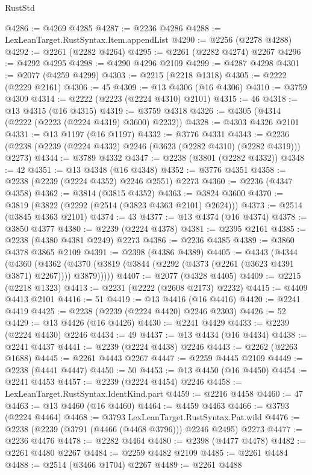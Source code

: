 \begin{lexlean}{RustStd}
\begin{coremodule}
@4286 := @4269 @4285
@4287 := @2236 @4286
@4288 := LexLeanTarget.RustSyntax.Item.appendList
@4290 := @2256 (@2278 @4288)
@4292 := @2261 (@2282 @4264)
@4295 := @2261 (@2282 @4274) @2267
@4296 := @4292 @4295
@4298 := @4290 @4296 @2109
@4299 := @4287 @4298
@4301 := @2077 (@4259 @4299)
@4303 := @2215 (@2218 @1318)
@4305 := @2222 (@2229 @2161)
@4306 := 45
@4309 := @13 @4306 (@16 @4306)
@4310 := @3759 @4309
@4314 := @2222 (@2223 (@2224 @4310) @2101)
@4315 := 46
@4318 := @13 @4315 (@16 @4315)
@4319 := @3759 @4318
@4326 := @4305 (@4314 (@2222 (@2223 (@2224 @4319) @3600) @2232))
@4328 := @4303 @4326 @2101
@4331 := @13 @1197 (@16 @1197)
@4332 := @3776 @4331
@4343 := @2236 (@2238 (@2239 (@2224 @4332) @2246 (@3623 (@2282 @4310) (@2282 @4319))) @2273)
@4344 := @3789 @4332
@4347 := @2238 (@3801 (@2282 @4332))
@4348 := 42
@4351 := @13 @4348 (@16 @4348)
@4352 := @3776 @4351
@4358 := @2238 (@2239 (@2224 @4352) @2246 @2551) @2273
@4360 := @2236 (@4347 @4358)
@4362 := @3814 (@3815 @4352)
@4363 := @3824 @3600
@4370 := @3819 (@3822 (@2292 (@2514 (@3823 @4363 @2101) @2624)))
@4373 := @2514 (@3845 @4363 @2101)
@4374 := 43
@4377 := @13 @4374 (@16 @4374)
@4378 := @3850 @4377
@4380 := @2239 (@2224 @4378)
@4381 := @2395 @2161
@4385 := @2238 (@4380 @4381 @2249) @2273
@4386 := @2236 @4385
@4389 := @3860 @4378 @3865 @2109
@4391 := @2398 (@4386 @4389)
@4405 := @4343
    (@4344
      (@4360
        (@4362 (@4370 (@3819 (@3844 (@2292 (@4373 (@2261 (@3623 @4391 @3871) @2267)))) @3879)))))
@4407 := @2077 (@4328 @4405)
@4409 := @2215 (@2218 @1323)
@4413 := @2231 (@2222 (@2608 @2173) @2232)
@4415 := @4409 @4413 @2101
@4416 := 51
@4419 := @13 @4416 (@16 @4416)
@4420 := @2241 @4419
@4425 := @2238 (@2239 (@2224 @4420) @2246 @2303)
@4426 := 52
@4429 := @13 @4426 (@16 @4426)
@4430 := @2241 @4429
@4433 := @2239 (@2224 @4430) @2246
@4434 := 49
@4437 := @13 @4434 (@16 @4434)
@4438 := @2241 @4437
@4441 := @2239 (@2224 @4438) @2246
@4443 := @2262 (@2263 @1688)
@4445 := @2261 @4443 @2267
@4447 := @2259 @4445 @2109
@4449 := @2238 (@4441 @4447)
@4450 := 50
@4453 := @13 @4450 (@16 @4450)
@4454 := @2241 @4453
@4457 := @2239 (@2224 @4454) @2246
@4458 := LexLeanTarget.RustSyntax.IdentKind.part
@4459 := @2216 @4458
@4460 := 47
@4463 := @13 @4460 (@16 @4460)
@4464 := @4459 @4463
@4466 := @3793 (@2224 @4464)
@4468 := @3793 LexLeanTarget.RustSyntax.Pat.wild
@4476 := @2238 (@2239 (@3791 (@4466 (@4468 @3796))) @2246 @2495) @2273
@4477 := @2236 @4476
@4478 := @2282 @4464
@4480 := @2398 (@4477 @4478)
@4482 := @2261 @4480 @2267
@4484 := @2259 @4482 @2109
@4485 := @2261 @4484
@4488 := @2514 (@3466 @1704) @2267
@4489 := @2261 @4488

\end{coremodule}
\end{lexlean}
